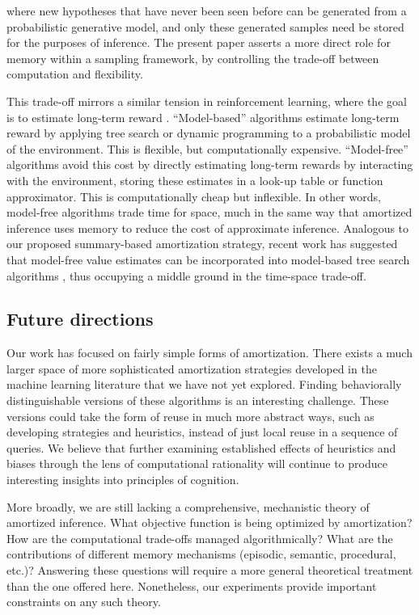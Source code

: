 where new hypotheses that have never been seen before can be generated from a probabilistic generative model, and only these generated samples need be stored for the purposes of inference. The present paper asserts a more direct role for memory within a sampling framework, by controlling the trade-off between computation and flexibility.

This trade-off mirrors a similar tension in reinforcement learning, where the goal is to estimate long-term reward \citep{daw2005uncertainty,daw2011model,kool2017cost}. ``Model-based'' algorithms estimate long-term reward by applying tree search or dynamic programming to a probabilistic model of the environment. This is flexible, but computationally expensive. ``Model-free'' algorithms avoid this cost by directly estimating long-term rewards by interacting with the environment, storing these estimates in a look-up table or function approximator. This is computationally cheap but inflexible. In other words, model-free algorithms trade time for space, much in the same way that amortized inference uses memory to reduce the cost of approximate inference. Analogous to our proposed summary-based amortization strategy, recent work has suggested that model-free value estimates can be incorporated into model-based tree search algorithms \citep{keramati2016adaptive}, thus occupying a middle ground in the time-space trade-off.

\subsection{Future directions}

Our work has focused on fairly simple forms of amortization. There exists a much larger space of more sophisticated amortization strategies developed in the machine learning literature \citep[e.g.,][]{stuhlmuller2013learning,rezende2014stochastic} that we have not yet explored. Finding behaviorally distinguishable versions of these algorithms is an interesting challenge. These versions could take the form of reuse in much more abstract ways, such as developing strategies and heuristics, instead of just local reuse in a sequence of queries. We believe that further examining established effects of heuristics and biases through the lens of computational rationality will continue to produce interesting insights into principles of cognition.

More broadly, we are still lacking a comprehensive, mechanistic theory of amortized inference. What objective function is being optimized by amortization? 
How are the computational trade-offs managed algorithmically? What are the contributions of different memory mechanisms (episodic, semantic, procedural, etc.)? Answering these questions will require a more general theoretical treatment than the one offered here. Nonetheless, our experiments provide important constraints on any such theory.

